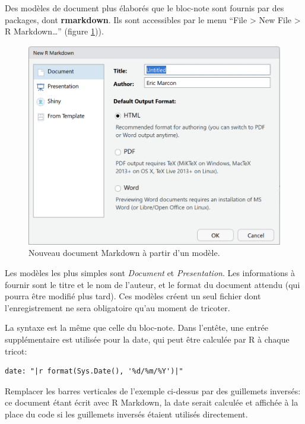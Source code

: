 \documentclass[
  12pt,
  french,
  a4paper,
  extrafontsizes,onecolumn,openright
  ]{memoir}
\begin{document}
Des modèles de document plus élaborés que le bloc-note sont fournis par des packages, dont \textbf{rmarkdown}.
Ils sont accessibles par le menu \enquote{File \textgreater{} New File \textgreater{} R Markdown\ldots{}} (figure \ref{fig:e-rmd1})).



\scriptsize

\begin{figure}

{\centering \includegraphics[width=0.8\linewidth]{images/e-rmd1} 

}

\caption{Nouveau document Markdown à partir d'un modèle.}\label{fig:e-rmd1}
\end{figure}

\normalsize

Les modèles les plus simples sont \emph{Document} et \emph{Presentation}.
Les informations à fournir sont le titre et le nom de l'auteur, et le format du document attendu (qui pourra être modifié plus tard).
Ces modèles créent un seul fichier dont l'enregistrement ne sera obligatoire qu'au moment de tricoter.

La syntaxe est la même que celle du bloc-note.
Dans l'entête, une entrée supplémentaire est utilisée pour la date, qui peut être calculée par R à chaque tricot:

\begin{verbatim}
date: "|r format(Sys.Date(), '%d/%m/%Y')|"
\end{verbatim}

Remplacer les barres verticales \texttt{\textbar{}} de l'exemple ci-dessus par des guillemets inversés: ce document étant écrit avec R Markdown, la date serait calculée et affichée à la place du code si les guillemets inversés étaient utilisés directement.
\end{document}
